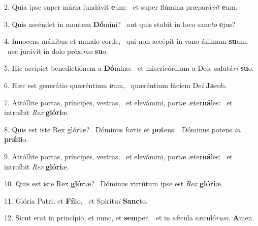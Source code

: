 2. Quia ipse super mária fundávit \textbf{e}um: \ast\  et super flúmina præpará\textit{vit} \textbf{e}um.\

3. Quis ascéndet in montem \textbf{Dó}mini? \ast\  aut quis stabit in loco sanc\textit{to} \textbf{e}jus?\

4. Innocens mánibus et mundo corde, \dag\  qui non accépit in vano ánimam \textbf{su}am, \ast\  nec jurávit in dolo próxi\textit{mo} \textbf{su}o.\

5. Hic accípiet benedictiónem a \textbf{Dó}mino: \ast\  et misericórdiam a Deo, salutá\textit{ri} \textbf{su}o.\

6. Hæc est generátio quæréntium \textbf{e}um, \ast\  quæréntium fáciem De\textit{i} \textbf{Ja}cob.\

7. Attóllite portas, príncipes, vestras, \dag\  et elevámini, portæ æter\textbf{ná}les: \ast\  et introíbit \textit{Rex} \textbf{gló}\textbf{ri}æ.\

8. Quis est iste Rex glóriæ? \dag\  Dóminus fortis et \textbf{pot}ens: \ast\  Dóminus potens \textit{in} \textbf{prǽ}\textbf{li}o.\

9. Attóllite portas, príncipes, vestras, \dag\  et elevámini, portæ æter\textbf{ná}les: \ast\  et introíbit \textit{Rex} \textbf{gló}\textbf{ri}æ.\

10. Quis est iste Rex \textbf{gló}riæ? \ast\  Dóminus virtútum ipse est \textit{Rex} \textbf{gló}\textbf{ri}æ.\

11. Glória Patri, et \textbf{Fí}lio, \ast\  et Spirítu\textit{i} \textbf{Sanc}to.\

12. Sicut erat in princípio, et nunc, et \textbf{sem}per, \ast\  et in sǽcula sæculó\textit{rum}. \textbf{A}men.\

